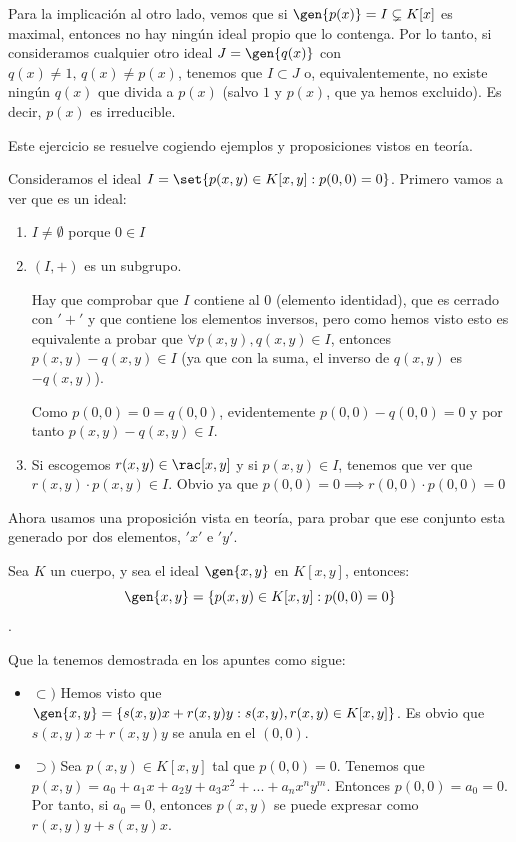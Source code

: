 \begin{problem}
Para la implicación al otro lado, vemos que si $\gen{p(x)} = I \subsetneq K[x]$ es maximal, entonces no hay ningún ideal propio que lo contenga. Por lo tanto, si consideramos cualquier otro ideal $J = \gen{q(x)}$ con $q(x) ≠ 1,\,q(x) ≠ p(x)$, tenemos que $I \subset J$ o, equivalentemente, no existe ningún $q(x)$ que divida a $p(x)$ (salvo $1$ y $p(x)$, que ya hemos excluido). Es decir, $p(x)$ es irreducible.

\spart

Este ejercicio se resuelve cogiendo ejemplos y proposiciones vistos en teoría.

Consideramos el ideal $I=\set{p(x,y)\in K[x,y]\tq p(0,0)=0 }$. Primero vamos a ver que es un ideal:
\begin{enumerate}
	\item $I \neq \emptyset$ porque $0 \in I$
	\item $(I,+)$ es un subgrupo.

	Hay que comprobar que $I$ contiene al 0 (elemento identidad), que es cerrado con $'+'$ y que contiene los elementos inversos, pero como hemos visto esto es equivalente a probar que $\forall p(x,y), q(x,y) \in I$, entonces $p(x,y)-q(x,y) \in I$ (ya que con la suma, el inverso de $q(x,y)$ es $-q(x,y)$).

	Como $p(0,0)=0=q(0,0)$, evidentemente $p(0,0)-q(0,0)=0$ y por tanto $p(x,y)-q(x,y) \in I$.

	\item Si escogemos $r(x,y) \in \rac[x,y]$ y si $p(x,y) \in I$, tenemos que ver que $r(x,y)\cdot p(x,y) \in I$. Obvio ya que $p(0,0)=0 \implies r(0,0)\cdot p(0,0) = 0$
\end{enumerate}

Ahora usamos una proposición vista en teoría, para probar que ese conjunto esta generado por dos elementos, $'x'$ e $'y'$.

Sea $K$ un cuerpo, y sea el ideal $\gen{x,y}$ en $K[x,y]$, entonces:
$$\gen{x,y}=\{p(x,y)\in K[x,y]:p(0,0)=0 \}$$.

Que la tenemos demostrada en los apuntes como sigue:
\begin{itemize}
	\item $\subset)$ Hemos visto que $\gen{x,y}=\{s(x,y) x+r(x,y) y: s(x,y),r(x,y) \in K[x,y] \}$. Es obvio que $s(x,y) x+r(x,y) y$ se anula en el $(0,0)$.
	\item $\supset)$ Sea $p(x,y) \in K[x,y]$ tal que $p(0,0)=0$. Tenemos que $p(x,y)=a_0+a_1x+a_2y+a_3x^2+...+a_nx^ny^m$. Entonces $p(0,0)=a_0=0$. Por tanto, si $a_0=0$, entonces $p(x,y)$ se puede expresar como $r(x,y)y+s(x,y)x$.
\end{itemize}


\end{problem}
